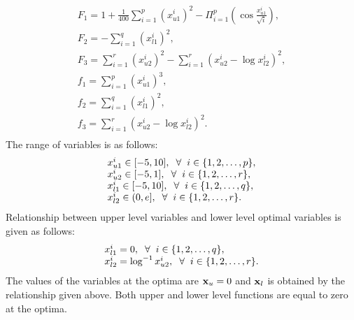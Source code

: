 \documentclass[twoside]{article}
\begin{document}
\begin{equation}
\begin{array}{l}
F_1 = 1 + \frac{1}{400}\sum_{i=1}^{p} \left(x_{u1}^{i}\right)^2 - \Pi_{i=1}^{p} \left(\cos \frac{x_{u1}^{i}}{\sqrt{i}}\right),\\
F_2 = - \sum_{i=1}^{q} (x_{l1}^{i})^2,\\
F_3 = \sum_{i=1}^{r} (x_{u2}^{i})^2 - \sum_{i=1}^{r} (x_{u2}^{i} - \log x_{l2}^{i})^2,\\
f_1 = \sum_{i=1}^{p} (x_{u1}^{i})^3,\\
f_2 = \sum_{i=1}^{q} (x_{l1}^{i})^2,\\
f_3 = \sum_{i=1}^{r} (x_{u2}^{i} - \log x_{l2}^{i})^2.\\
\end{array}
\end{equation}
The range of variables is as follows:
\begin{equation}
\begin{array}{l}
x_{u1}^{i} \in [-5,10], \hspace{2mm} \forall \hspace{2mm} i \in \{1,2,\ldots,p\},\\
x_{u2}^{i} \in [-5,1], \hspace{2mm} \forall \hspace{2mm} i \in \{1,2,\ldots,r\},\\
x_{l1}^{i} \in [-5,10], \hspace{2mm} \forall \hspace{2mm} i \in \{1,2,\ldots,q\},\\
x_{l2}^{i} \in (0,e], \hspace{2mm} \forall \hspace{2mm} i \in \{1,2,\ldots,r\}.
\end{array}
\end{equation}
Relationship between upper level variables and lower level optimal variables is given as follows:
\begin{equation}
\begin{array}{l}
x_{l1}^{i} = 0, \hspace{2mm} \forall \hspace{2mm} i \in \{1,2,\ldots,q\},\\
x_{l2}^{i} = \log^{-1} x_{u2}^{i}, \hspace{2mm} \forall \hspace{2mm} i \in \{1,2,\ldots,r\}.
\end{array}
\end{equation}
The values of the variables at the optima are $\mbox{$\mathbf{x}$}_u=0$ and $\mbox{$\mathbf{x}$}_l$ is obtained by the relationship given above. Both upper and
lower level functions are equal to zero at the optima.
\end{document}
